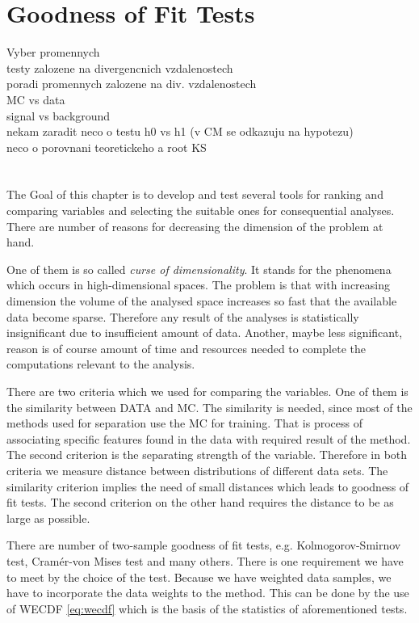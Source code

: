\chapter{Goodness of Fit Tests}
\label{ch:GoF}

Vyber promennych \\
testy zalozene na divergencnich vzdalenostech \\
poradi promennych zalozene na div. vzdalenostech\\
 MC vs data\\
signal vs background \\
nekam zaradit neco o testu h0 vs h1 (v CM se odkazuju na hypotezu) \\
neco o porovnani teoretickeho a root KS \\
\\
\\


\noindent The Goal of this chapter is to develop and test several tools for ranking and comparing variables and selecting the suitable ones for consequential analyses. There are number of reasons for decreasing the dimension of the problem at hand. 

One of them is so called {\em curse of dimensionality}. It stands for the phenomena which occurs in high-dimensional spaces. The problem is that with increasing dimension the volume of the analysed space increases so fast that the available data become sparse. Therefore any result of the analyses is statistically insignificant due to insufficient amount of data. Another, maybe less significant, reason is of course amount of time and resources needed to complete the computations relevant to the analysis. 

There are two criteria which we used for comparing the variables. One of them is the similarity between DATA and MC. The similarity is needed, since most of the methods used for separation use the MC for training. That is process of associating specific features found in the data with required result of the method. The second criterion is the separating strength of the variable. Therefore in both criteria we measure distance between distributions of different data sets. The similarity criterion implies the need of small distances which leads to goodness of fit tests. The second criterion on the other hand requires the distance to be as large as possible. 

There are number of two-sample goodness of fit  tests, e.g. Kolmogorov-Smirnov test, Cram\'{e}r-von Mises test and many others. There is one requirement we have to meet by the choice of the test. Because we have weighted data samples, we have to incorporate the data weights to the method. This can be done by the use of WECDF  \eqref{eq:wecdf} which is the basis of the statistics of aforementioned tests. 

